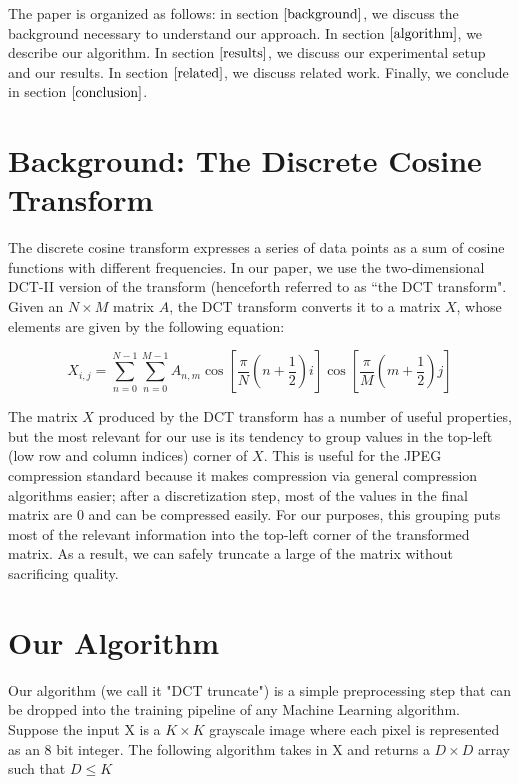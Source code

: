 \documentclass[12pt]{article}
\begin{document}
The paper is organized as follows: in section $\ref{background}$, we discuss the background necessary to understand our approach.  In section $\ref{algorithm}$, we describe our algorithm.  In section $\ref{results}$, we discuss our experimental setup and our results.  In section $\ref{related}$, we discuss related work.  Finally, we conclude in section $\ref{conclusion}$.

\section{Background: The Discrete Cosine Transform} \label{background}

The discrete cosine transform \cite{ahmed} expresses a series of data points as a sum of cosine functions with different frequencies.  In our paper, we use the two-dimensional DCT-II version of the transform (henceforth referred to as ``the DCT transform".  Given an $N \times M$ matrix $A$, the DCT transform converts it to a matrix $X$, whose elements are given by the following equation:

\[ X_{i,j} = \sum_{n = 0}^{N-1} \sum_{n = 0}^{M-1} A_{n, m} \cos\left[ \frac{\pi}{N} \left( n + \frac{1}{2}\right)i \right] \cos\left[ \frac{\pi}{M} \left( m + \frac{1}{2}\right)j \right]\]

The matrix $X$ produced by the DCT transform has a number of useful properties, but the most relevant for our use is its tendency to group values in the top-left (low row and column indices) corner of $X$.  This is useful for the JPEG compression standard because it makes compression via general compression algorithms easier; after a discretization step, most of the values in the final matrix are $0$ and can be compressed easily.  For our purposes, this grouping puts most of the relevant information into the top-left corner of the transformed matrix.  As a result, we can safely truncate a large of the matrix without sacrificing quality.

\section{Our Algorithm} \label{algorithm}

Our algorithm (we call it "DCT truncate") is a simple preprocessing step that can be dropped into the training pipeline of any Machine Learning algorithm. Suppose the input X is a $K \times K$ grayscale image where each pixel is represented as an 8 bit integer. The following algorithm takes in X and returns a $D \times D$ array such that $D \leq K$
\end{document}
